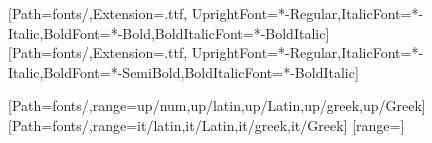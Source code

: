 
\newcommand{\seriestitle}{Η Γλώσσα των Μαθηματικών}   %
\newcommand{\booktitle}{Μαθηματικά ΣΤ' Δημοτικού}
\newcommand{\bookauthor}{Ιωάννης Ψωμιάδης}
\newif\ifdraft \drafttrue   %

\usepackage[paperwidth=170mm,paperheight=240mm,inner=20mm,outer=16mm,top=20mm,bottom=22mm,headsep=6mm,footskip=10mm]{geometry}

\usepackage{fontspec}
\usepackage{polyglossia}
\setdefaultlanguage{greek}
\setmainfont{Commissioner}[Path=fonts/,Extension=.ttf,
  UprightFont=*-Regular,ItalicFont=*-Italic,BoldFont=*-Bold,BoldItalicFont=*-BoldItalic]
\setsansfont{Commissioner}[Path=fonts/,Extension=.ttf,
  UprightFont=*-Regular,ItalicFont=*-Italic,BoldFont=*-SemiBold,BoldItalicFont=*-BoldItalic]

\usepackage{amsmath}
\usepackage{unicode-math}      %
[Path=fonts/,range={up/num,up/latin,up/Latin,up/greek,up/Greek}]
[Path=fonts/,range={it/latin,it/Latin,it/greek,it/Greek}]
[range={}]
\newcommand{\tdot}{\mathord{.}}%

\usepackage{xcolor}

